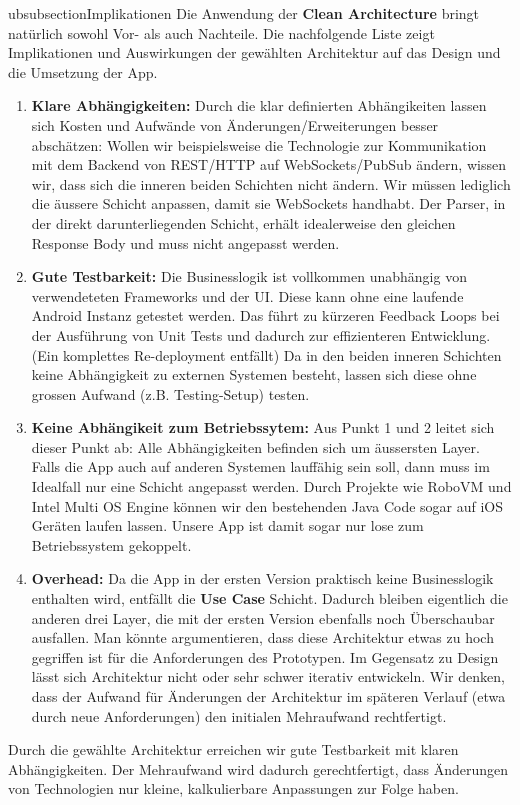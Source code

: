 \documentclass[a4paper,10pt,xetex]{article}
\begin{document}
ubsubsection{Implikationen}\label{implications}
Die Anwendung der \textbf{Clean Architecture} bringt natürlich sowohl Vor- als 
auch Nachteile. Die nachfolgende Liste zeigt Implikationen und Auswirkungen der 
gewählten Architektur auf das Design und die Umsetzung der App. 
\begin{enumerate}
    \item \textbf{Klare Abhängigkeiten:} Durch die klar definierten Abhängikeiten 
	lassen sich Kosten und Aufwände von Änderungen/Erweiterungen besser abschätzen: 
	Wollen wir beispielsweise die Technologie zur Kommunikation mit dem 
	Backend von REST/HTTP auf WebSockets/PubSub ändern, wissen wir, dass sich 
	die inneren beiden Schichten nicht ändern. Wir müssen lediglich die äussere 
	Schicht anpassen, damit sie WebSockets handhabt. Der Parser, in der direkt 
	darunterliegenden Schicht, erhält idealerweise den gleichen Response Body 
	und muss nicht angepasst werden. 
    \item \textbf{Gute Testbarkeit:} Die Businesslogik ist vollkommen unabhängig 
	von verwendeteten Frameworks und der UI. Diese kann ohne eine laufende 
	Android Instanz getestet werden. Das führt zu kürzeren Feedback Loops 
	bei der Ausführung von Unit Tests und dadurch zur effizienteren Entwicklung. 
	(Ein komplettes Re-deployment entfällt) 
	Da in den beiden inneren Schichten keine Abhängigkeit zu externen Systemen 
	besteht, lassen sich diese ohne grossen Aufwand (z.B. Testing-Setup) testen.
    \item \textbf{Keine Abhängikeit zum Betriebssytem:} Aus Punkt 1 und 2 
	leitet sich dieser Punkt ab: Alle Abhängigkeiten befinden sich um 
	äussersten Layer. Falls die App auch auf anderen Systemen lauffähig sein soll, 
	dann muss im Idealfall nur eine Schicht angepasst werden. Durch Projekte 
	wie RoboVM und Intel Multi OS Engine können wir den bestehenden Java Code 
	sogar auf iOS Geräten laufen lassen. Unsere App ist damit sogar nur lose 
	zum Betriebssystem gekoppelt.  
    \item \textbf{Overhead:} Da die App in der ersten Version praktisch keine 
	Businesslogik enthalten wird, entfällt die \textbf{Use Case} Schicht. 
	Dadurch bleiben eigentlich die anderen drei Layer, die mit der ersten 
	Version ebenfalls noch Überschaubar ausfallen. Man könnte argumentieren, 
	dass diese Architektur etwas zu hoch gegriffen ist für die Anforderungen 
	des Prototypen. Im Gegensatz zu Design lässt sich Architektur nicht oder 
	sehr schwer iterativ entwickeln. Wir denken, dass der Aufwand für Änderungen 
	der Architektur im späteren Verlauf (etwa durch neue Anforderungen) den 
	initialen Mehraufwand rechtfertigt.   
    \end{enumerate}
    Durch die gewählte Architektur erreichen wir gute Testbarkeit mit klaren 
    Abhängigkeiten. Der Mehraufwand wird dadurch gerechtfertigt, dass Änderungen 
    von Technologien nur kleine, kalkulierbare Anpassungen zur Folge haben.
\end{document}
